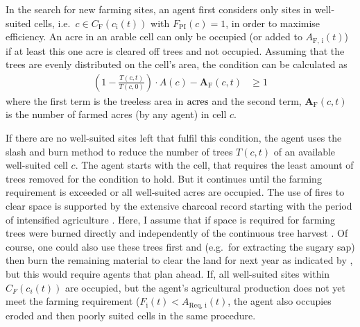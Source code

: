 In the search for new farming sites, an agent first considers only sites in well-suited cells, i.e.\ $c \in C_\text{F}(c_\text{i}(t))$ with $F_\text{PI}(c)=1$, in order to maximise efficiency.
An acre in an arable cell can only be occupied (or added to $A_\text{F, i}(t)$) if at least this one acre is cleared off trees and not occupied. 
Assuming that the trees are evenly distributed on the cell's area, the condition can be calculated as 
\begin{eqnarray}
\left( 1 - \frac{T(c,t)}{T(c,0)} \right) \cdot A(c) - \mathbf{A}_\text{F}(c, t) & \geq   1
\label{eq:BurningCond}
\end{eqnarray}
where the first term is the treeless area in ${\rm acres}$ and the second term, $\mathbf{A}_\text{F}(c, t)$ is the number of farmed acres (by any agent) in cell $c$.

If there are no well-suited sites left that fulfil this condition, the agent uses the slash and burn method to reduce the number of trees $T(c,t)$ of an available well-suited cell $c$.
The agent starts with the cell, that requires the least amount of trees removed for the condition to hold.
But it continues until the farming requirement is exceeded or all well-suited acres are occupied.
The use of fires to clear space is supported by the extensive charcoal record starting with the period of intensified agriculture \citep{Mieth2015}. 
Here, I assume that if space is required for farming trees were burned directly and independently of the continuous tree harvest .
Of course, one could also use these trees first and (e.g.\ for extracting the sugary sap) then burn the remaining material to clear the land for next year as indicated by \citet{Mieth2015}, but this would require agents that plan ahead.
If, all well-suited sites within $C_F(c_i(t))$ are occupied, but the agent's agricultural production does not yet meet the farming requirement ($F_\text{i}(t)<A_\text{Req, i}(t)$, the agent also occupies eroded and then  poorly suited cells in the same procedure.

\TODO

